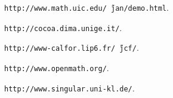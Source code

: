 \documentclass[runningheads]{cl2emult}
\begin{document}
\begin{thebibliography}{7}
{\tt http://www.math.uic.edu/\~\,jan/demo.html}.

{\tt http://cocoa.dima.unige.it/}.

{\tt http://www-calfor.lip6.fr/\~\,jcf/}.


{\tt http://www.openmath.org/}.

{\tt http://www.singular.uni-kl.de/}.

\end{thebibliography}

\clearpage
{}
\flushbottom
\printindex
\end{document}
